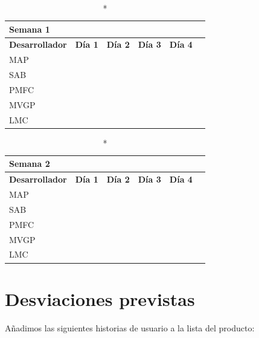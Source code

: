 \documentclass[11pt]{article}
\begin{document}
\begin{longtable}{lrrrrr}
  \caption*{Semana 1}\\
  \toprule
  \textbf{Desarrollador} & \textbf{Día 1} & \textbf{Día 2} & \textbf{Día 3} & \textbf{Día 4} \\
  \midrule
  MAP &  & \\
  SAB &  & \\
  PMFC \\
  MVGP & & \\
  LMC \\
  \bottomrule
\end{longtable}

\begin{longtable}{lrrrrr}
  \caption*{Semana 2}\\
  \toprule
  \textbf{Desarrollador} & \textbf{Día 1} & \textbf{Día 2} & \textbf{Día 3} & \textbf{Día 4} \\
  \midrule
  MAP &  & \\
  SAB &  & \\
  PMFC \\
  MVGP & & \\
  LMC \\
  \bottomrule
\end{longtable}

\section{Desviaciones previstas}

Añadimos las siguientes historias de usuario a la lista del producto:
\end{document}
